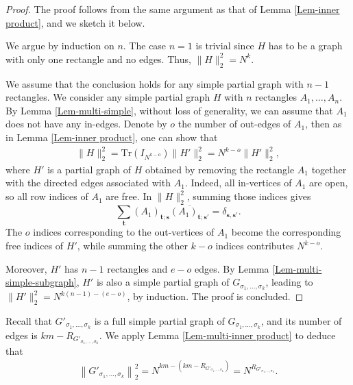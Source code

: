 \documentclass[12pt]{article}
\numberwithin{equation}{section}
\theoremstyle{plain}
\def\Tr{\mathrm {Tr}}
\begin{document}
\begin{proof}
The proof follows from the same argument as that of Lemma \ref{Lem-inner product}, and we sketch it below.

We argue by induction on $n$. The case $n=1$ is trivial since $H$ has to be a graph with only one rectangle and no edges. Thus, $\|H\|_2^2 = N^k$.

We assume that the conclusion holds for any simple partial graph with $n-1$ rectangles.
We consider any simple partial graph $H$ with $n$ rectangles $A_1, \ldots, A_n$.
By Lemma \ref{Lem-multi-simple}, without loss of generality, we can assume that $A_1$ does not have any in-edges. Denote by $o$ the number of out-edges of $A_1$, then as in Lemma \ref{Lem-inner product}, one can show that
\begin{align*}
    \|H\|_2^2 = \Tr(I_{N^{k-o}}) \|H'\|_2^2 = N^{k-o} \|H'\|_2^2,
\end{align*}
where $H'$ is a partial graph of $H$ obtained by removing the rectangle $A_1$ together with the directed edges associated with $A_1$. Indeed, all in-vertices of $A_1$ are open, so all row indices of $A_1$ are free. In $\|H\|_2^2$, summing those indices gives
\[
\sum_{\mathbf t}(A_1)_{\mathbf t;\mathbf s}
\overline{(A_1)_{\mathbf t;\mathbf s'}}
=\delta_{\mathbf s,\mathbf s'}.
\]
The $o$ indices corresponding to the out-vertices of $A_1$ become the corresponding free indices of $H'$, while summing the other $k-o$ indices contributes $N^{k-o}$.

Moreover, $H'$ has $n-1$ rectangles and $e-o$ edges.
By Lemma \ref{Lem-multi-simple-subgraph}, $H'$ is also a simple partial graph of $G_{\sigma_1,\ldots,\sigma_k}$, leading to $\|H'\|_2^2 = N^{k(n-1)-(e-o)}$, by induction. The proof is concluded.
\end{proof}

Recall that $G'_{\sigma_1,\ldots,\sigma_k}$ is a full simple partial graph of $G_{\sigma_1,\ldots,\sigma_k}$, and its number of edges is $km - R_{G'_{\sigma_1,\ldots,\sigma_k}}$. We apply Lemma \ref{Lem-multi-inner product} to deduce that
\begin{align} \label{eq-G'-multi}
    \left\| G'_{\sigma_1,\ldots,\sigma_k} \right\|_2^2
    = N^{km - (km - R_{G'_{\sigma_1,\ldots,\sigma_k}})}
    = N^{R_{G'_{\sigma_1,\ldots,\sigma_k}}}.
\end{align}
\end{document}
